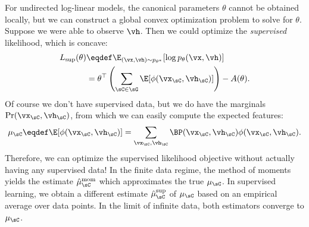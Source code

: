 For undirected log-linear models, the canonical parameters $\theta$ cannot be obtained locally,
but we can construct a global convex optimization problem to solve for $\theta$.
Suppose we were able to observe $\vh$.
Then we could optimize the \emph{supervised} likelihood, which is concave:
\begin{align}
  L_\text{sup}(\theta)
  & \eqdef \E_{(\vx,\vh) \sim p_{\theta^*}}[\log p_\theta(\vx,\vh)] \nonumber \\
  & = \theta^\top \left(\sum_{\sC \in \sG} \E[\phi(\vx_\sC,\vh_\sC)]\right) - A(\theta).
\label{eqn:logLinearSupervised}
\end{align}
Of course we don't have supervised data,
but we do have the marginals $\Pr(\vx_\sC,\vh_\sC)$,
from which we can easily compute the expected features:
\begin{align}
\label{eqn:logLinearFeatures}
\mu_\sC \eqdef \E[\phi(\vx_\sC,\vh_\sC)] = \sum_{\vx_\sC,\vh_\sC} \BP(\vx_\sC,\vh_\sC) \phi(\vx_\sC,\vh_\sC).
\end{align}
Therefore, we can optimize the supervised likelihood objective without actually
having any supervised data!
In the finite data regime, the method of moments yields the estimate
$\hat \mu^\text{mom}_\sC$ which approximates the true $\mu_\sC$.
In supervised learning, we obtain a different estimate $\hat\mu^\text{sup}_\sC$ of $\mu_\sC$ based on an empirical average
over data points.
In the limit of infinite data, both estimators converge to $\mu_\sC$.


